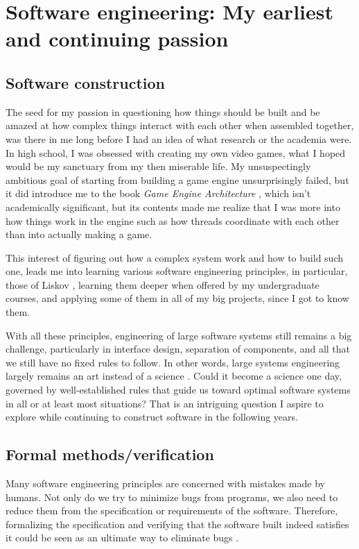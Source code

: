 \documentclass[10pt]{article}
\begin{document}
\section[Software engineering]{
Software engineering: My earliest and continuing passion}
\subsection{Software construction}
The seed for my passion in questioning how things should be built and be amazed
at how complex things interact with each other when assembled together, was
there in me long before I had an idea of what research or the academia were. In
high school, I was obsessed with creating my own video games, what I hoped
would be my sanctuary from my then miserable life. My unsuspectingly ambitious
goal of starting from building a game engine unsurprisingly failed, but it did
introduce me to the book \emph{Game Engine Architecture}
\cite{game.engine.arch}, which isn't academically significant, but its contents
made me realize that I was more into how things work in the engine such as how
threads coordinate with each other than into actually making a game.

This interest of figuring out how a complex system work and how to build such
one, leads me into learning various software engineering principles, in
particular, those of Liskov \cite{liskov.adt, liskov.subtype}, learning them
deeper when offered by my undergraduate courses, and applying some of them in
all of my big projects, since I got to know them. 

With all these principles, engineering of large software systems still remains
a big challenge, particularly in interface design, separation of components,
and all that we still have no fixed rules to follow. In other words, large
systems engineering largely remains an art instead of a science
\cite{no.silver.bullet, prospect.eng.discipline.software}. Could it become a
science one day, governed by well-established rules that guide us toward
optimal software systems in all or at least most situations? That is an
intriguing question I aspire to explore while continuing to construct software
in the following years.

\subsection{Formal methods/verification}
Many software engineering principles are concerned with mistakes made by
humans. Not only do we try to minimize bugs from programs, we also need to
reduce them from the specification or requirements of the software.  Therefore,
formalizing the specification and verifying that the software built indeed
satisfies it could be seen as an ultimate way to eliminate bugs
\cite{hoare.axiomatic.prog}. 
\end{document}
